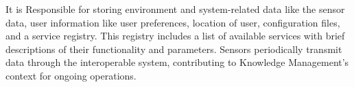 It is Responsible for storing environment and system-related data like the sensor data, user information like user preferences, location of user, configuration files, and a service registry. This registry includes a list of available services with brief descriptions of their functionality and parameters. Sensors periodically transmit data through the interoperable system, contributing to Knowledge Management's context for ongoing operations.